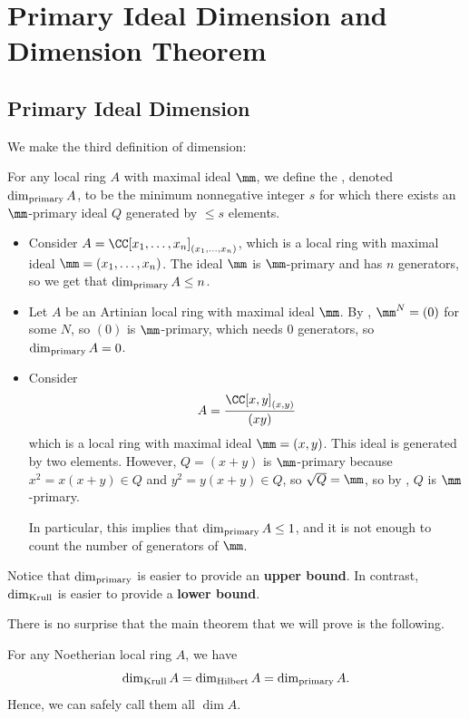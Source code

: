 \section{Primary Ideal Dimension and Dimension Theorem}
\subsection{Primary Ideal Dimension}
We make the third definition of dimension:
\begin{definition}
    For any local ring $A$ with maximal ideal $\mm$,
    we define the ,
    denoted $\dim_{\text{primary}} A$, to be the minimum
    nonnegative integer $s$ for which there exists
    an $\mm$-primary ideal $Q$ generated by 
    $\leq s$ elements.
\end{definition}
\begin{example}
    \begin{itemize}
    \item Consider $A=\CC[x_1,\dots,x_n]_{(x_1,\dots,x_n)}$,
    which is a local ring with maximal ideal
    $\mm = (x_1,\dots,x_n)$. 
    The ideal $\mm$ is $\mm$-primary and has $n$ generators,
    so we get that $\dim_{\text{primary}} A \leq n$.
    \item Let $A$ be an Artinian local ring 
    with maximal ideal $\mm$.
    By , $\mm^N=(0)$
    for some $N$, so $(0)$ is  $\mm$-primary,
    which needs $0$ generators, so $\dim_{\text{primary}} A = 0$.
    \item Consider
    $$A = \frac{\CC[x,y]_{(x,y)}}{(xy)}$$
    which is a local ring with maximal ideal $\mm=(x,y)$.
    This ideal is generated by two elements.
    However, $Q=(x+y)$ is $\mm$-primary because
    $x^2=x(x+y)\in Q$ and $y^2=y(x+y)\in Q$,
    so $\sqrt Q = \mm$, so by ,
    $Q$ is $\mm$-primary.

    In particular, this implies that 
    $\dim_{\text{primary}} A \leq 1$, and it is not enough to count
    the number of generators of $\mm$.
    \end{itemize}
    Notice that $\dim_{\text{primary}}$ is easier to provide
    an \textbf{upper bound}.
    In contrast, $\dim_{\text{Krull}}$ is easier to provide
    a \textbf{lower bound}.
\end{example}
There is no surprise that the main theorem
that we will prove is the following.
\begin{theorem}
    \label{thm:dimension}
    For any Noetherian local ring $A$, we have
    $$\dim_{\text{Krull}} A = \dim_{\text{Hilbert}} A = \dim_{\text{primary}} A.$$
    Hence, we can safely call them all $\dim A$.
\end{theorem}


